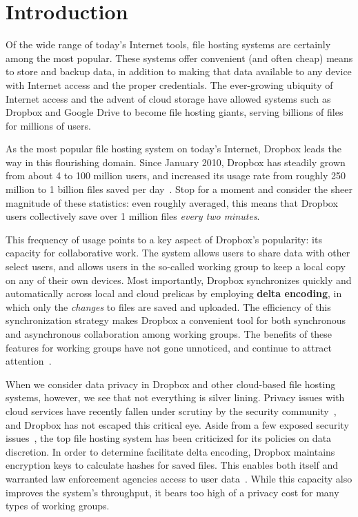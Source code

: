 \section{Introduction}
\label{introduction}
Of the wide range of today's Internet tools,
file hosting systems are certainly among the most popular.
These systems offer convenient (and often cheap) means
to store and backup data, in addition to making that data available
to any device with Internet access and the proper credentials.
The ever-growing ubiquity of Internet access
and the advent of cloud storage have allowed systems such as Dropbox
and Google Drive to become file hosting giants,
serving billions of files for millions of users.

As the most popular file hosting system on today's Internet,
Dropbox leads the way in this flourishing domain.
Since January 2010, Dropbox has steadily grown from about 4 to 100 million users,
and increased its usage rate from roughly 250 million to 1 billion files saved per day~\cite{dropboxstats}.
Stop for a moment and consider the sheer magnitude of these statistics:
even roughly averaged, this means that Dropbox users collectively save over
1 million files \emph{every two minutes}.

This frequency of usage points to a key aspect of Dropbox's popularity:
its capacity for collaborative work.
The system allows users to share data with other select users,
and allows users in the so-called working group to keep a local copy
on any of their own devices.
Most importantly, Dropbox synchronizes quickly and automatically across local and cloud prelicas
by employing \textbf{delta encoding},
in which only the \emph{changes} to files are saved and uploaded.
The efficiency of this synchronization strategy makes Dropbox a convenient tool
for both synchronous and asynchronous collaboration among working groups.
The benefits of these features for working groups have not gone
unnoticed, and continue to attract attention~\cite{dropboxmercurial,dropboxcollab}.

When we consider data privacy in Dropbox and other cloud-based file hosting systems, however, we see that not everything is silver lining.
Privacy issues with cloud services have recently
fallen under scrutiny by the security community~\cite{van2010impossibility,soghoian2010caught}, and Dropbox has not escaped this critical eye.
Aside from a few exposed security issues~\cite{mulazzani2011dark,dropboxsecurity},
the top file hosting system has been criticized for its policies on data discretion.
In order to determine facilitate delta encoding,
Dropbox maintains encryption keys to calculate hashes for saved files.
This enables both itself and warranted law enforcement agencies
access to user data~\cite{dropboxprivacy}.
While this capacity also improves the system's throughput,
it bears too high of a privacy cost for many types of working groups.

